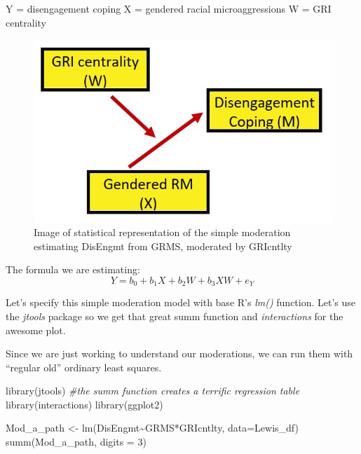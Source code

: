 \documentclass[
]{book}
\newenvironment{Shaded}{\begin{snugshade}}{\end{snugshade}}
\newcommand{\AttributeTok}[1]{\textcolor[rgb]{0.77,0.63,0.00}{#1}}
\newcommand{\CommentTok}[1]{\textcolor[rgb]{0.56,0.35,0.01}{\textit{#1}}}
\newcommand{\DecValTok}[1]{\textcolor[rgb]{0.00,0.00,0.81}{#1}}
\newcommand{\FunctionTok}[1]{\textcolor[rgb]{0.00,0.00,0.00}{#1}}
\newcommand{\NormalTok}[1]{#1}
\newcommand{\OtherTok}[1]{\textcolor[rgb]{0.56,0.35,0.01}{#1}}
\newcommand{\SpecialCharTok}[1]{\textcolor[rgb]{0.00,0.00,0.00}{#1}}
\begin{document}
Y = disengagement coping
X = gendered racial microaggressions
W = GRI centrality

\begin{figure}
\centering
\includegraphics{images/ModMed/LewisMod1.jpg}
\caption{Image of statistical representation of the simple moderation estimating DisEngmt from GRMS, moderated by GRIcntlty}
\end{figure}

The formula we are estimating:
\[Y=b_{0}+b_{1}X+b_{2}W+b_{3}XW+e_{Y}\]

Let's specify this simple moderation model with base R's \emph{lm()} function. Let's use the \emph{jtools} package so we get that great summ function and \emph{interactions} for the awesome plot.

Since we are just working to understand our moderations, we can run them with ``regular old'' ordinary least squares.

\begin{Shaded}
\begin{Highlighting}[]
\FunctionTok{library}\NormalTok{(jtools) }\CommentTok{\#the summ function creates a terrific regression table}
\FunctionTok{library}\NormalTok{(interactions)}
\FunctionTok{library}\NormalTok{(ggplot2)}

\NormalTok{Mod\_a\_path }\OtherTok{\textless{}{-}} \FunctionTok{lm}\NormalTok{(DisEngmt}\SpecialCharTok{\textasciitilde{}}\NormalTok{GRMS}\SpecialCharTok{*}\NormalTok{GRIcntlty, }\AttributeTok{data=}\NormalTok{Lewis\_df)}
\FunctionTok{summ}\NormalTok{(Mod\_a\_path, }\AttributeTok{digits =} \DecValTok{3}\NormalTok{)}
\end{Highlighting}
\end{Shaded}
\end{document}
